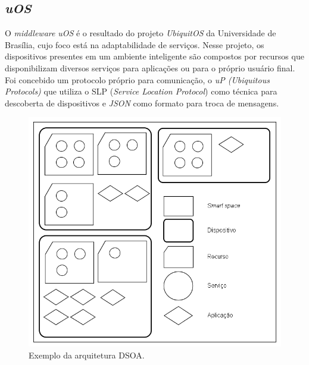 \subsection{\emph{uOS}}
\label{subsec:introUos}

O \emph{middleware} \emph{uOS} é o resultado do projeto \emph{UbiquitOS} da Universidade de Brasília, cujo foco está na adaptabilidade de serviços. Nesse projeto, os dispositivos presentes em um ambiente inteligente são compostos por recursos que disponibilizam diversos serviços para aplicações ou para o próprio usuário final. Foi concebido um protocolo próprio para comunicação, o \emph{uP (Ubiquitous Protocols)} que utiliza o SLP (\emph{Service Location Protocol}) como técnica para descoberta de dispositivos e \emph{JSON} como formato para troca de mensagens.

\begin{figure}[ht]
	\center
	\includegraphics[scale=0.5]{imagens/arquiteturaDSOA}
	\caption{Exemplo da arquitetura DSOA.}
	\label{fig:arquiteturaDSOA}
\end{figure}

